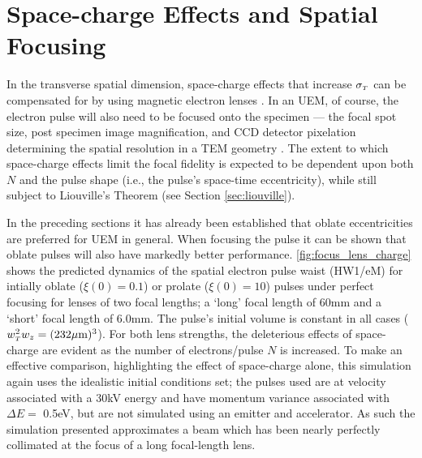
\section{Space-charge Effects and Spatial Focusing} \label{sec:mag_lens_charge}

In the transverse spatial dimension, space-charge effects that increase $ \sigma_{ {\scriptscriptstyle T} } $ can be compensated for by using magnetic electron lenses \cite{oudheusden_electron_2007,lagrange_nanosecond_2008}.
In an UEM, of course, the electron pulse will also need to be focused onto the specimen --- the focal spot size, post specimen image magnification, and CCD detector pixelation determining the spatial resolution in a TEM geometry \cite{berger_dc_2009}.
The extent to which space-charge effects limit the focal fidelity is expected to be dependent upon both $N$ and the pulse shape (i.e., the pulse's space-time eccentricity), while still subject to Liouville's Theorem (see Section \ref{sec:liouville}).



In the preceding sections it has already been established that oblate eccentricities are preferred for UEM in general.
When focusing the pulse it can be shown that oblate pulses will also have markedly better performance.
\ref{fig:focus_lens_charge} shows the predicted dynamics of the spatial electron pulse waist (HW1/eM) for intially oblate ($ \xi ( 0 ) = 0.1 $) or prolate ($ \xi ( 0 ) = 10 $) pulses under perfect focusing for lenses of two focal lengths; a `long' focal length of 60mm and a `short' focal length of 6.0mm.
The pulse's initial volume is constant in all cases ($w_{{\scriptscriptstyle T}}^2 w_{z} = (232 \mu\text{m})^3$).
For both lens strengths, the deleterious effects of space-charge are evident as the number of electrons/pulse $ N $ is increased.
To make an effective comparison, highlighting the effect of space-charge alone, this simulation again uses the idealistic initial conditions set; the pulses used are at velocity associated with a 30kV energy and have momentum variance associated with $\Delta E = $ 0.5eV, but are not simulated using an emitter and accelerator.
As such the simulation presented approximates a beam which has been nearly perfectly collimated at the focus of a long focal-length lens.

